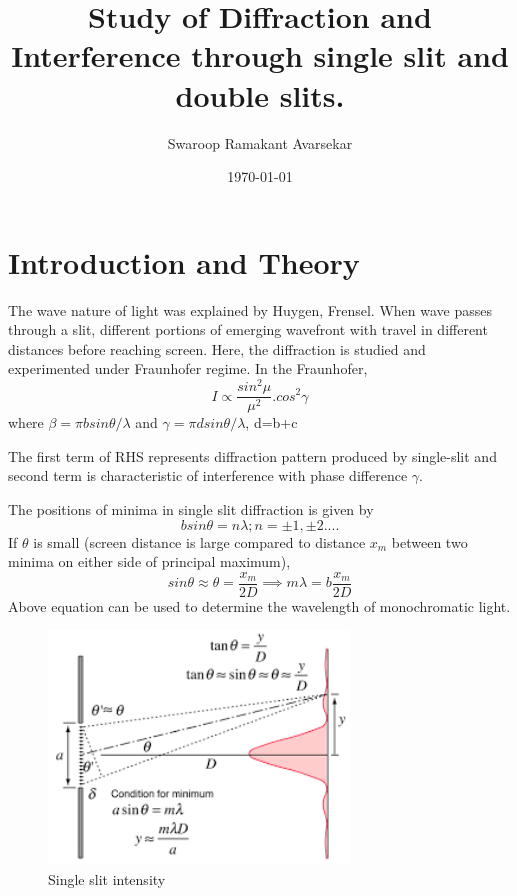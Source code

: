 \documentclass[a4paper, amsfonts, amssymb, amsmath, reprint, showkeys, nofootinbib, twoside]{revtex4-1}
\begin{document}
\title{Study of Diffraction and Interference through single slit and double slits.}
\author{Swaroop Ramakant Avarsekar}
\date{\today}
	
\maketitle

\section{Introduction and Theory}
The wave nature of light was explained by Huygen, Frensel. When wave passes through a slit, different portions of emerging wavefront with travel in different distances before reaching screen. Here, the diffraction is studied and experimented under Fraunhofer regime. In the Fraunhofer, 
\begin{equation}
	I\propto \frac{sin^2\mu}{\mu^2}. cos^2\gamma
\end{equation}
 where $\beta=\pi b sin \theta/\lambda$ and $\gamma=\pi d sin \theta/\lambda$, d=b+c
 
 The first term of RHS represents diffraction pattern produced by single-slit and second term is characteristic of interference with phase difference $\gamma$. 

The positions of minima in single slit diffraction is given by
\begin{equation}
	bsin\theta=n\lambda; n=\pm1,\pm2....
\end{equation}
 If $\theta$ is small (screen distance is large compared to distance $x_m$ between two minima on either side of principal maximum), 
 \begin{equation}
 	sin\theta \approx \theta=\frac{x_m}{2D} \implies m\lambda=b\frac{x_m}{2D} 
 \end{equation}
Above equation can be used to determine the wavelength of monochromatic light. 

\begin{figure}[htbp] %
	\centering
	\includegraphics[width=8cm]{5} 
	\caption{Single slit intensity}
	\label{1}
\end{figure}
\end{document}
